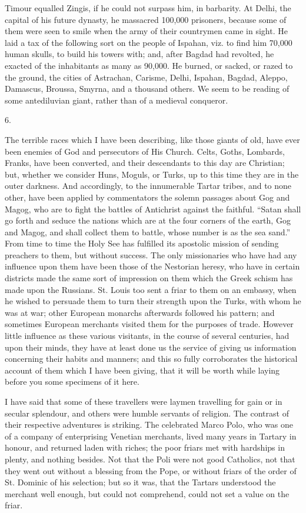 Timour equalled Zingis, if he
could not surpass him, in barbarity. At Delhi, the capital of his
future dynasty, he massacred 100,000 prisoners, because some of them
were seen to smile when the army of their countrymen came in sight. He
laid a tax of the following sort on the people of Ispahan, viz. to
find him 70,000 human skulls, to build his towers with; and,
after Bagdad had revolted, he exacted of the inhabitants as many as
90,000. He burned, or sacked, or razed to the ground, the cities of
Astrachan, Carisme, Delhi, Ispahan, Bagdad, Aleppo, Damascus, Broussa,
Smyrna, and a thousand others. We seem to be reading of some
antediluvian giant, rather than of a medieval conqueror.

6.

The terrible races which I
have been describing, like those giants of old, have ever been enemies
of God and persecutors of His Church. Celts, Goths, Lombards, Franks,
have been converted, and their descendants to this day are Christian;
but, whether we consider Huns, Moguls, or Turks, up to this time they
are in the outer darkness. And accordingly, to the innumerable Tartar
tribes, and to none other, have been applied by commentators the
solemn passages about Gog and Magog, who are to fight the battles of
Antichrist against the faithful. ``Satan shall go forth and seduce the
nations which are at the four corners of the earth, Gog and Magog, and
shall collect them to battle, whose number is as the sea sand.'' From
time to time the Holy See has fulfilled its apostolic mission of
sending preachers to them, but without success. The only missionaries
who have had any influence upon them have been those of the Nestorian
heresy, who have in certain districts made the same sort of impression
on them which the Greek schism has made upon the Russians. St. Louis
too sent a friar to them on an embassy, when he wished to persuade
them to turn their strength upon the Turks, with whom he was at war;
other European monarchs afterwards followed his pattern; and sometimes
European merchants visited them for the purposes of trade. However little influence as these various visitants, in the course of
several centuries, had upon their minds, they have at least done us
the service of giving us information concerning their habits and
manners; and this so fully corroborates the historical account of them
which I have been giving, that it will be worth while laying before
you some specimens of it here.

I have said that some of these
travellers were laymen travelling for gain or in secular splendour,
and others were humble servants of religion. The contrast of their
respective adventures is striking. The celebrated Marco Polo, who was
one of a company of enterprising Venetian merchants, lived many years
in Tartary in honour, and returned laden with riches; the poor friars
met with hardships in plenty, and nothing besides. Not that the Poli
were not good Catholics, not that they went out without a blessing
from the Pope, or without friars of the order of St. Dominic of his
selection; but so it was, that the Tartars understood the merchant
well enough, but could not comprehend, could not set a value on the
friar.

